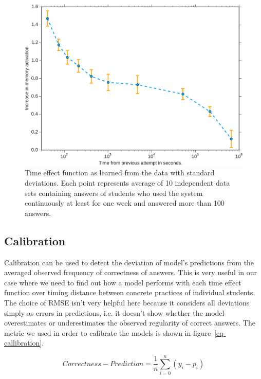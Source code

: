 \begin{figure}[htbp]
  \centering
  \includegraphics[width=\textwidth]{img/learned-time-effect-function}
  \caption{Time effect function as learned from the data with standard deviations. Each point represents average of 10 independent data sets containing answers of students who used the system continuously at least for one week and answered more than 100 answers.}
  \label{learned-time-effect-function}
\end{figure}

\subsection{Calibration}

Calibration can be used to detect the deviation of model's predictions from the averaged observed frequency of correctness of answers. This is very useful in our case where we need to find out how a model performs with each time effect function over timing distance between concrete practices of individual students. The choice of RMSE isn't very helpful here because it considers all deviations simply as errors in predictions, i.e. it doesn't show whether the model overestimates or underestimates the observed regularity of correct answers. The metric we used in order to calibrate the models is shown in figure~\ref{eq-callibration}.

\begin{equation} \label{eq-callibration}
  \mathit{Correctness} - \mathit{Prediction} = \frac{1}{n} \sum_{i=0}^{n} (y_i - p_i)
\end{equation}


